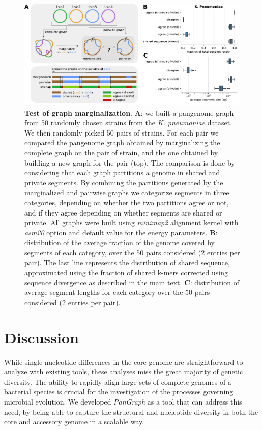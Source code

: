 \documentclass[aps,rmp,reprint,superscriptaddress,notitlepage,10pt]{revtex4-1}
\begin{document}
\begin{figure}[htb]
    \includegraphics[width=\textwidth]{figs/marginalize_test.pdf}
    \caption{{\bf Test of graph marginalization}.
        \textbf{A}: we built a pangenome graph from 50 randomly chosen strains from the \textit{K. pneumoniae} dataset. We then randomly picked 50 pairs of strains. For each pair we compared the pangenome graph obtained by marginalizing the complete graph on the pair of strain, and the one obtained by building a new graph for the pair (top). The comparison is done by considering that each graph partitions a genome in shared and private segments. By combining the partitions generated by the marginalized and pairwise graphs we categorize segments in three categories, depending on whether the two partitions agree or not, and if they agree depending on whether segments are shared or private. All graphs were built using \textit{minimap2} alignment kernel with \textit{asm20} option and default value for the energy parameters.
        \textbf{B}: distribution of the average fraction of the genome covered by segments of each category, over the 50 pairs considered (2 entries per pair). The last line represents the distribution of shared sequence, approximated using the fraction of shared k-mers corrected using sequence divergence as described in the main text.
        \textbf{C}: distribution of average segment lengths for each category over the 50 pairs considered (2 entries per pair).
    }
    \label{fig:marginalization}
\end{figure}



\section{Discussion}

While single nucleotide differences in the core genome are straightforward to analyze with existing tools, these analyses miss the great majority of genetic diversity. The ability to rapidly align large sets of complete genomes of a bacterial species is crucial for the investigation of the processes governing microbial evolution. We developed \textit{PanGraph} as a tool that can address this need, by being able to capture the structural and nucleotide diversity in both the core and accessory genome in a scalable way.
\end{document}
